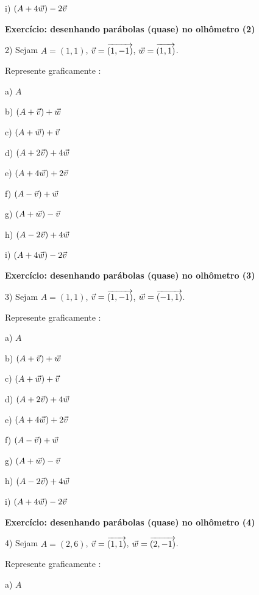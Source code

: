 \documentclass[oneside,12pt]{article}
\begin{document}
i) $(A+4{\vec w})-2{\vec v}$


\newpage


{\bf Exercício: desenhando parábolas (quase) no olhômetro (2)}

2) Sejam $A=(1,1)$, ${\vec v} = {\overrightarrow{(1,-1)}}$, ${\vec w} = {\overrightarrow{(1,1)}}$.

Represente graficamente :

a) $A$

b) $(A+{\vec v})+{\vec w}$

c) $(A+{\vec w})+{\vec v}$

d) $(A+2{\vec v})+4{\vec w}$

e) $(A+4{\vec w})+2{\vec v}$

f) $(A-{\vec v})+{\vec w}$

g) $(A+{\vec w})-{\vec v}$

h) $(A-2{\vec v})+4{\vec w}$

i) $(A+4{\vec w})-2{\vec v}$

\newpage


{\bf Exercício: desenhando parábolas (quase) no olhômetro (3)}

3) Sejam $A=(1,1)$, ${\vec v} = {\overrightarrow{(1,-1)}}$, ${\vec w} = {\overrightarrow{(-1,1)}}$.

Represente graficamente :

a) $A$

b) $(A+{\vec v})+{\vec w}$

c) $(A+{\vec w})+{\vec v}$

d) $(A+2{\vec v})+4{\vec w}$

e) $(A+4{\vec w})+2{\vec v}$

f) $(A-{\vec v})+{\vec w}$

g) $(A+{\vec w})-{\vec v}$

h) $(A-2{\vec v})+4{\vec w}$

i) $(A+4{\vec w})-2{\vec v}$


\newpage


{\bf Exercício: desenhando parábolas (quase) no olhômetro (4)}

4) Sejam $A=(2,6)$, ${\vec v} = {\overrightarrow{(1,1)}}$, ${\vec w} = {\overrightarrow{(2,-1)}}$.

Represente graficamente :

a) $A$
\end{document}
